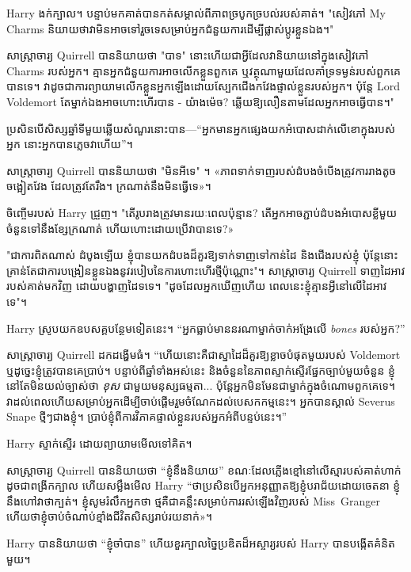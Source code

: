 Harry ងក់ក្បាល។ បន្ទាប់មកគាត់បានកត់សម្គាល់ពីភាពច្របូកច្របល់របស់គាត់។ "សៀវភៅ My Charms និយាយថាវាមិនអាចទៅរួចទេសម្រាប់អ្នកជំនួយការដើម្បីផ្លាស់ប្តូរខ្លួនឯង។"

សាស្រ្តាចារ្យ Quirrell បាននិយាយថា "បាទ" នោះហើយជាអ្វីដែលវានិយាយនៅក្នុងសៀវភៅ Charms របស់អ្នក។ គ្មានអ្នកជំនួយការអាចលើកខ្លួនពួកគេ ឬវត្ថុណាមួយដែលគាំទ្រទម្ងន់របស់ពួកគេបានទេ។ វាដូចជាការព្យាយាមលើកខ្លួនអ្នកឡើងដោយស្បែកជើងកវែងផ្ទាល់ខ្លួនរបស់អ្នក។ ប៉ុន្តែ Lord Voldemort តែម្នាក់ឯងអាចហោះហើរបាន - យ៉ាងម៉េច? ឆ្លើយឱ្យលឿនតាមដែលអ្នកអាចធ្វើបាន។"

ប្រសិនបើ​សិស្ស​ឆ្នាំ​ទី​មួយ​ឆ្លើយ​សំណួរ​នោះ​បាន—“អ្នក​មាន​អ្នក​ផ្សេង​យក​អំបោស​ដាក់​លើ​ខោ​ក្នុង​របស់​អ្នក នោះ​អ្នក​បាន​ភ្លេច​វា​ហើយ”។

សាស្រ្តាចារ្យ Quirrell បាននិយាយថា "មិនអីទេ" ។ «​ភាព​ទាក់ទាញ​របស់​ដំបង​ចំបើង​ត្រូវការ​រាង​តូច​ចង្អៀត​វែង ដែល​ត្រូវតែ​រឹង។ ក្រណាត់នឹងមិនធ្វើទេ»។

ចិញ្ចើមរបស់ Harry ជ្រួញ។ "តើរូបរាងត្រូវមានរយៈពេលប៉ុន្មាន? តើ​អ្នក​អាច​ភ្ជាប់​ដំបង​អំបោស​ខ្លី​មួយ​ចំនួន​ទៅ​នឹង​ខ្សែ​ក្រណាត់ ហើយ​ហោះ​ដោយ​ប្រើ​វា​បាន​ទេ?»

"ជាការពិតណាស់ ដំបូងឡើយ ខ្ញុំបានយកដំបងដ៏គួរឱ្យទាក់ទាញទៅកាន់ដៃ និងជើងរបស់ខ្ញុំ ប៉ុន្តែនោះគ្រាន់តែជាការបង្រៀនខ្លួនឯងនូវរបៀបនៃការហោះហើរថ្មីប៉ុណ្ណោះ"។ សាស្ត្រាចារ្យ Quirrell ទាញដៃអាវរបស់គាត់មកវិញ ដោយបង្ហាញដៃទទេ។ "ដូចដែលអ្នកឃើញហើយ ពេលនេះខ្ញុំគ្មានអ្វីនៅលើដៃអាវទេ"។

Harry ស្រូបយកឧបសគ្គបន្ថែមទៀតនេះ។ “អ្នក​ធ្លាប់​មាន​នរណា​ម្នាក់​ចាក់​អង្រែ​លើ \emph{bones} របស់​អ្នក?”

សាស្រ្តាចារ្យ Quirrell ដកដង្ហើមធំ។ “ហើយនោះគឺជាស្នាដៃដ៏គួរឱ្យខ្លាចបំផុតមួយរបស់ Voldemort ឬដូច្នេះខ្ញុំត្រូវបានគេប្រាប់។ បន្ទាប់ពីឆ្នាំទាំងអស់នេះ និងចំនួននៃភាពស្ទាក់ស្ទើរផ្នែកច្បាប់មួយចំនួន ខ្ញុំនៅតែមិនយល់ច្បាស់ថា \emph{ខុស} ជាមួយមនុស្សធម្មតា... ប៉ុន្តែអ្នកមិនមែនជាម្នាក់ក្នុងចំណោមពួកគេទេ។ វាដល់ពេលហើយសម្រាប់អ្នកដើម្បីចាប់ផ្តើមរួមចំណែកដល់បេសកកម្មនេះ។ អ្នកបានស្គាល់ Severus Snape ថ្មីៗជាងខ្ញុំ\@។ ប្រាប់ខ្ញុំពីការវិភាគផ្ទាល់ខ្លួនរបស់អ្នកអំពីបន្ទប់នេះ។”

Harry ស្ទាក់ស្ទើរ ដោយព្យាយាមមើលទៅគិត។

សាស្ត្រាចារ្យ Quirrell បាននិយាយថា “ខ្ញុំនឹងនិយាយ” ខណៈដែលភ្លើងខ្មៅនៅលើស្មារបស់គាត់ហាក់ដូចជាពង្រីកក្បាល ហើយសម្លឹងមើល Harry “ថាប្រសិនបើអ្នកអនុញ្ញាតឱ្យខ្ញុំបរាជ័យដោយចេតនា ខ្ញុំនឹងហៅវាថាក្បត់។ ខ្ញុំ​សូម​រំលឹក​អ្នក​ថា ថ្ម​គឺជា​គន្លឹះ​សម្រាប់​ការ​រស់​ឡើង​វិញ​របស់ Miss~Granger ហើយ​ថា​ខ្ញុំ​ចាប់​ចំណាប់ខ្មាំង​ជីវិត​សិស្ស​រាប់​រយ​នាក់»។

Harry បាននិយាយថា “ខ្ញុំចាំបាន” ហើយខួរក្បាលច្នៃប្រឌិតដ៏អស្ចារ្យរបស់ Harry បានបង្កើតគំនិតមួយ។

